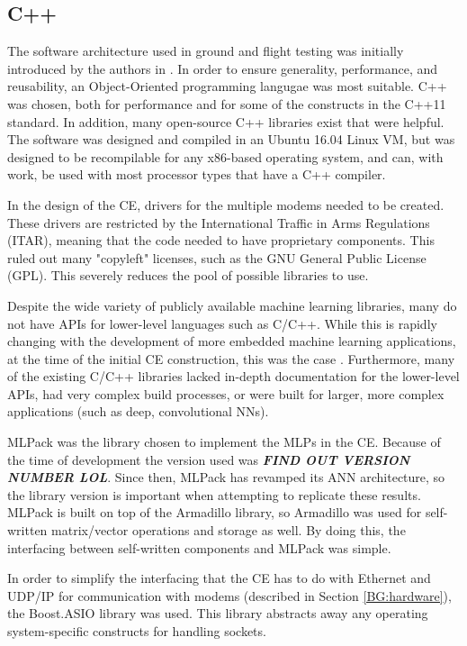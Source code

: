\subsection{C++}
\par The software architecture used in ground and flight testing was initially introduced by the authors in \cite{lol cite it}. In order to ensure generality, performance, and reusability, an Object-Oriented programming langugae was most suitable. C++ was chosen, both for performance and for some of the constructs in the C++11 standard. In addition, many open-source C++ libraries exist that were helpful. The software was designed and compiled in an Ubuntu 16.04 Linux VM, but was designed to be recompilable for any x86-based operating system, and can, with work, be used with most processor types that have a C++ compiler.
\par In the design of the CE, drivers for the multiple modems needed to be created. These drivers are restricted by the International Traffic in Arms Regulations (ITAR), meaning that the code needed to have proprietary components. This ruled out many "copyleft" licenses, such as the GNU General Public License (GPL). This severely reduces the pool of possible libraries to use. 
\par Despite the wide variety of publicly available machine learning libraries, many do not have APIs for lower-level languages such as C/C++. While this is rapidly changing with the development of more embedded machine learning applications, at the time of the initial CE construction, this was the case \cite{lol tim paper}. Furthermore, many of the existing C/C++ libraries lacked in-depth documentation for the lower-level APIs, had very complex build processes, or were built for larger, more complex applications (such as deep, convolutional NNs). 
\par MLPack \cite{cite_MLPAck_lol} was the library chosen to implement the MLPs in the CE. Because of the time of development the version used was \textbf{\textit{FIND OUT VERSION NUMBER LOL}}. Since then, MLPack has revamped its ANN architecture, so the library version is important when attempting to replicate these results. MLPack is built on top of the Armadillo \cite{cite_armadillo_lol} library, so Armadillo was used for self-written matrix/vector operations and storage as well. By doing this, the interfacing between self-written components and MLPack was simple. 
\par In order to simplify the interfacing that the CE has to do with Ethernet and UDP/IP for communication with modems (described in Section \ref{BG:hardware}), the Boost.ASIO \cite{cite_boostasio_lol} library was used. This library abstracts away any operating system-specific constructs for handling sockets.
